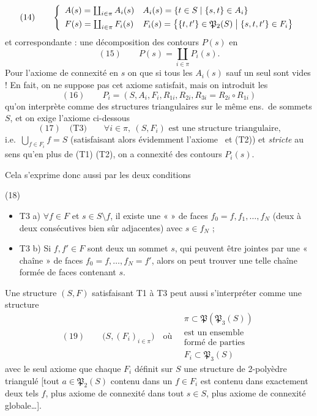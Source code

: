 \documentclass[11pt,a4paper]{article}
\begin{document}
\[
(14) \qquad
\left\{
\begin{array}{ll}
A(s) = \coprod_{i \in \pi} A_i(s) & A_i(s) = \{ t \in S \mid \{s, t\} \in A_i \} \\[4pt]
F(s) = \coprod_{i \in \pi} F_i(s) & F_i(s) = \bigl\{ \{t, t'\} \in \mathfrak{P}_2(S) \bigm| \{s, t, t'\} \in F_i \bigr\}
\end{array}
\right.
\]
et correspondante : une décomposition des contours $P(s)$ en
\[
(15) \qquad P(s) = \coprod_{i \in \pi} P_i(s) .
\]
Pour l'axiome de connexité en $s$ on  que si tous les $A_i(s)$ sauf un seul sont vides !  En fait, on ne suppose pas cet axiome satisfait, mais on introduit les
\[
(16) \qquad P_i = (S, A_i, F_i, R_{1i}, R_{2i}, R_{3i} = R_{2i} \circ R_{1i})
\]
qu'on interprète comme des structures triangulaires sur le même ens.\ de sommets $S$, et on exige l'axiome ci-dessous
\[
(17) \quad \text{(T3)} \qquad \forall i \in \pi, \ (S, F_i) \text{ est une structure triangulaire,}
\]
i.e.\ $\bigcup_{f \in F_i} f = S$ (satisfaisant alors évidemment l'axiome \ et (T2)) et \emph{stricte} au sens qu'en plus de (T1) (T2), on a connexité des contours $P_i(s)$.

Cela s'exprime donc aussi par les deux conditions

(18)
\begin{itemize}
\item T3 a) $\forall f \in F$ et $s \in S \setminus f$, il existe une « \struck{\ill{}}  » de faces $f_0 = f, f_1, \ldots, f_N$ (deux à deux consécutives bien sûr adjacentes) avec $s \in f_N$ ;
\item T3 b) Si $f, f' \in F$  sont deux   un \struck{\ill{}} sommet $s$, qui peuvent être jointes par une « chaîne » de faces $f_0 = f, \ldots, f_N = f'$, alors on peut trouver une telle chaîne formée de faces contenant $s$.
\end{itemize}

Une structure $(S, F)$ satisfaisant T1 à T3 peut aussi s'interpréter comme une structure
\[
(19) \qquad \bigl( S, (F_i)_{i \in \pi} \bigr) \quad \text{où} \quad
\begin{array}{l}
\pi \subset \mathfrak{P}(\mathfrak{P}_3(S)) \\
\text{est un ensemble} \\
\text{formé de parties} \\
F_i \subset \mathfrak{P}_3(S)
\end{array}
\]
avec le seul axiome que chaque $F_i$ définit sur $S$ une structure de 2-polyèdre triangulé  [tout $a \in \mathfrak{P}_2(S)$ contenu dans un $f \in F_i$ est contenu dans exactement deux tels $f$, plus axiome de connexité dans tout   $s \in S$, plus axiome de connexité globale…].
\end{document}
